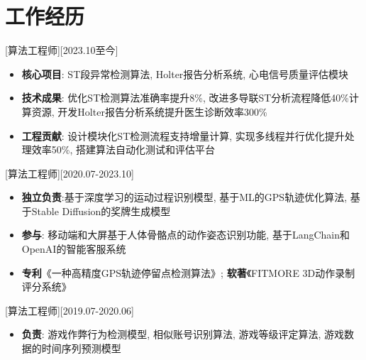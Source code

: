 \documentclass{resume}
\begin{document}
\section{工作经历}
[算法工程师][2023.10至今]
\begin{itemize}
    \item \textbf{核心项目}: ST段异常检测算法, Holter报告分析系统, 心电信号质量评估模块
    \item \textbf{技术成果}: 
        优化ST检测算法准确率提升8\%, 
        改进多导联ST分析流程降低40\%计算资源, 
        开发Holter报告分析系统提升医生诊断效率300\%
    \item \textbf{工程贡献}: 
        设计模块化ST检测流程支持增量计算,
        实现多线程并行优化提升处理效率50\%,
        搭建算法自动化测试和评估平台
\end{itemize}
[算法工程师][2020.07-2023.10]
\begin{itemize}
    \item \textbf{独立负责}:基于深度学习的运动过程识别模型, 基于ML的GPS轨迹优化算法, 基于Stable Diffusion的奖牌生成模型
    \item \textbf{参与}: 移动端和大屏基于人体骨骼点的动作姿态识别功能, 基于LangChain和OpenAI的智能客服系统
    \item \textbf{专利}《一种高精度GPS轨迹停留点检测算法》; \textbf{软著}《FITMORE 3D动作录制评分系统》
\end{itemize}
[算法工程师][2019.07-2020.06]
\begin{itemize}
    \item \textbf{负责}: 游戏作弊行为检测模型, 相似账号识别算法, 游戏等级评定算法, 游戏数据的时间序列预测模型
\end{itemize}
\end{document}
